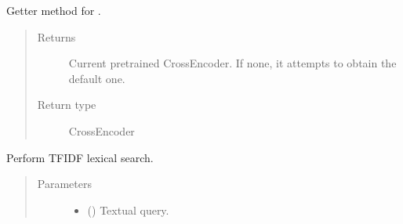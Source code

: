 \documentclass[letterpaper,10pt,english]{sphinxmanual}
\begin{document}
\begin{fulllineitems}
\begin{fulllineitems}
\end{fulllineitems}


\begin{fulllineitems}
\label{\detokenize{code:lexical_search.TfIdfSearch.crossencoder}}
Getter method for .
\begin{quote}\begin{description}
\item[{Returns}] \leavevmode
Current pretrained Cross\sphinxhyphen{}Encoder. If none, it attempts to obtain
the default one.

\item[{Return type}] \leavevmode
CrossEncoder

\end{description}\end{quote}

\end{fulllineitems}


\begin{fulllineitems}
\label{\detokenize{code:lexical_search.TfIdfSearch.search}}
Perform TF\sphinxhyphen{}IDF lexical search.
\begin{quote}\begin{description}
\item[{Parameters}] \leavevmode\begin{itemize}
\item {} 
 () \textendash{} Textual query.


\end{itemize}
\end{description}
\end{quote}
\end{fulllineitems}
\end{fulllineitems}
\end{document}
